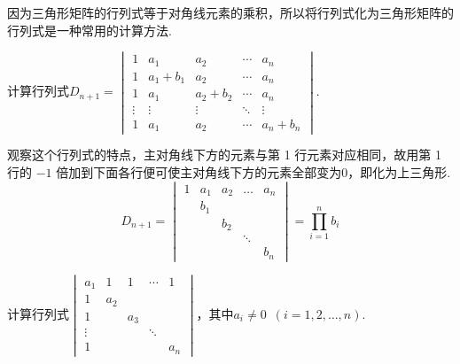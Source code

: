 因为三角形矩阵的行列式等于对角线元素的乘积，所以将行列式化为三角形矩阵的行列式是一种常用的计算方法.

\begin{example}{}{}
    计算行列式$D_{n+1}=\begin{vmatrix}
            1      & a_{1}       & a_{2}       & \cdots & a_n       \\
            1      & a_{1}+b_{1} & a_{2}       & \cdots & a_n       \\
            1      & a_{1}       & a_{2}+b_{2} & \cdots & a_n       \\
            \vdots & \vdots      & \vdots      & \ddots & \vdots    \\
            1      & a_{1}       & a_{2}       & \cdots & a_n+b_{n}
        \end{vmatrix}$.
\end{example}


\begin{solution}
    观察这个行列式的特点，主对角线下方的元素与第 1 行元素对应相同，故用第 1 行的 $-1$ 倍加到下面各行便可使主对角线下方的元素全部变为0，即化为上三角形.
    \[ D_{n+1}=\begin{vmatrix}
            1 & a_{1} & a_{2} & \ldots & a_n   \\
              & b_{1} &       &        &       \\
              &       & b_{2} &        &       \\
              &       &       & \ddots &       \\
              &       &       &        & b_{n}
        \end{vmatrix}=\prod_{i=1}^n b_i \]
\end{solution}

\begin{example}{}{}
    计算行列式$\begin{vmatrix}
            a_1    & 1   & 1   & \cdots & 1   \\
            1      & a_2                      \\
            1      &     & a_3                \\
            \vdots &     &     & \ddots       \\
            1      &     &     &        & a_n
        \end{vmatrix}$，其中$a_i\neq 0\enspace(i=1,2,\ldots,n)$.
\end{example}

